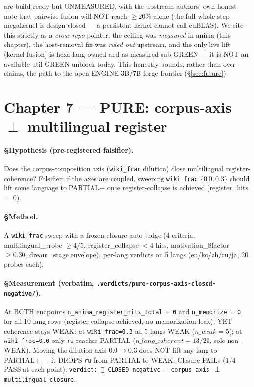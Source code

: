 \documentclass[11pt,a4paper]{article}
\begin{document}
\begin{itemize}
are build-ready but UNMEASURED, with the upstream authors' own honest note that
pairwise fusion will NOT reach $\ge20\%$ alone (the full whole-step megakernel is
design-closed --- a persistent kernel cannot call cuBLAS). We cite this strictly as a
\emph{cross-repo} pointer: the ceiling was \emph{measured} in anima (this chapter),
the host-removal fix was \emph{ruled out} upstream, and the only live lift (kernel
fusion) is hexa-lang-owned and as-measured sub-GREEN --- it is NOT an available
util-GREEN unblock today. This honestly bounds, rather than over-claims, the path to
the open ENGINE-3B/7B forge frontier (\S\ref{sec:future}).
\end{itemize}

\section{Chapter 7 --- PURE: corpus-axis $\perp$ multilingual register}
\label{sec:pure}

\paragraph{§Hypothesis (pre-registered falsifier).} Does the corpus-composition axis
(\texttt{wiki\_frac} dilution) close multilingual register-coherence? Falsifier: if
the axes are coupled, sweeping \texttt{wiki\_frac} $\{0.0,0.3\}$ should lift some
language to PARTIAL+ once register-collapse is achieved (register\_hits$=0$).

\paragraph{§Method.} A \texttt{wiki\_frac} sweep with a frozen closure auto-judge
(4 criteria: multilingual\_probe $\ge4/5$, register\_collapse $<4$ hits,
motivation\_8factor $\ge0.30$, dream\_stage envelope), per-lang verdicts on 5 langs
(en/ko/zh/ru/ja, 20 probes each).

\paragraph{§Measurement (verbatim,
\texttt{.verdicts/pure-corpus-axis-closed-negative/}).} At BOTH endpoints
\texttt{n\_anima\_register\_hits\_total = 0} and \texttt{n\_memorize = 0} for all 10
lang-rows (register collapse achieved, no memorization leak), YET coherence stays
WEAK: at \texttt{wiki\_frac=0.3} all 5 langs WEAK ($n\_weak{=}5$); at
\texttt{wiki\_frac=0.0} only \texttt{ru} reaches PARTIAL ($n\_lang\_coherent{=}13/20$,
sole non-WEAK). Moving the dilution axis $0.0\to0.3$ does NOT lift any lang to
PARTIAL+ --- it DROPS \texttt{ru} from PARTIAL to WEAK. Closure FAILs ($1/4$ PASS at
each point). \texttt{verdict: 🔴 CLOSED-negative — corpus-axis $\perp$ multilingual
closure}.
\end{document}
